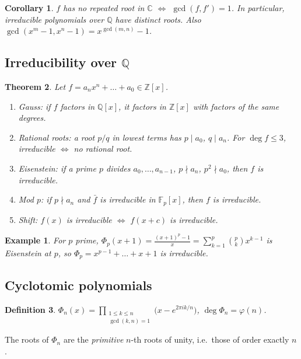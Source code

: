 \documentclass[12pt]{article}
\theoremstyle{breakplain}
\newtheorem{theorem}{Theorem}[section]
\newtheorem{corollary}[theorem]{Corollary}
\theoremstyle{breakdef}
\newtheorem{definition}[theorem]{Definition}
\newtheorem*{example}{Example}
\theoremstyle{remark}
\begin{document}
\begin{corollary}
$f$ has no repeated root in $\mathbb{C}$ $\iff$ $\gcd(f,f')=1$. In particular, irreducible polynomials over
$\mathbb{Q}$ have distinct roots. Also $\gcd(x^m-1,x^n-1)=x^{\gcd(m,n)}-1$.
\end{corollary}
 
\subsection*{Irreducibility over $\mathbb{Q}$}
 
\begin{theorem}
Let $f=a_nx^n+\dots+a_0\in\mathbb{Z}[x]$.
\begin{enumerate}
  \item \emph{Gauss:} if $f$ factors in $\mathbb{Q}[x]$, it factors in $\mathbb{Z}[x]$ with factors of the same degrees.
  \item \emph{Rational roots:} a root $p/q$ in lowest terms has $p\mid a_0$, $q\mid a_n$.
        For $\deg f\le3$, irreducible $\iff$ no rational root.
  \item \emph{Eisenstein:} if a prime $p$ divides $a_0,\dots,a_{n-1}$, $p\nmid a_n$, $p^2\nmid a_0$, then $f$ is irreducible.
  \item \emph{Mod $p$:} if $p\nmid a_n$ and $\bar f$ is irreducible in $\mathbb{F}_p[x]$, then $f$ is irreducible.
  \item \emph{Shift:} $f(x)$ is irreducible $\iff$ $f(x+c)$ is irreducible.
\end{enumerate}
\end{theorem}
 
\begin{example}
For $p$ prime, $\Phi_p(x+1)=\frac{(x+1)^p-1}{x}=\sum_{k=1}^{p}\binom{p}{k}x^{k-1}$ is Eisenstein at $p$,
so $\Phi_p=x^{p-1}+\dots+x+1$ is irreducible.
\end{example}
 
\subsection*{Cyclotomic polynomials}
 
\begin{definition}
$\displaystyle\Phi_n(x)=\prod_{\substack{1\le k\le n\\ \gcd(k,n)=1}}\bigl(x-e^{2\pi ik/n}\bigr)$, \quad $\deg\Phi_n=\varphi(n)$.
\end{definition}
 
The roots of $\Phi_n$ are the \emph{primitive} $n$-th roots of unity, i.e.\ those of order exactly $n$.
 
\end{document}
